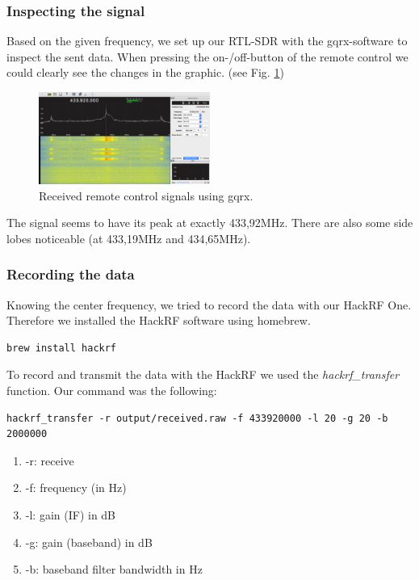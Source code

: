 \documentclass[conference]{IEEEtran}
\begin{document}
\subsubsection{Inspecting the signal}
Based on the given frequency, we set up our RTL-SDR with the gqrx-software to inspect the sent data. When pressing the on-/off-button of the remote control we could clearly see the changes in the graphic. (see Fig. \ref{fig:remote_gqrx})


\begin{figure}[H]
	\centering
	\includegraphics[width=0.5\textwidth]{gqrx_remote_control}
	\caption{Received remote control signals using gqrx.}
	\label{fig:remote_gqrx}
\end{figure}

The signal seems to have its peak at exactly 433,92MHz. There are also some side lobes noticeable (at 433,19MHz and 434,65MHz). 
\subsubsection{Recording the data}
Knowing the center frequency, we tried to record the data with our HackRF One. Therefore we installed the HackRF software \cite{hackrfsoftware} using homebrew.
\begin{lstlisting}
brew install hackrf
\end{lstlisting}

To record and transmit the data with the HackRF we used the \textit{hackrf\_transfer} function. Our command was the following:
\begin{lstlisting}
hackrf_transfer -r output/received.raw -f 433920000 -l 20 -g 20 -b 2000000
\end{lstlisting}
\begin{enumerate}
	\item -r: receive
	\item -f: frequency (in Hz)
	\item -l: gain (IF) in dB
	\item -g: gain (baseband) in dB
	\item -b: baseband filter bandwidth in Hz
\end{enumerate}
\bigbreak
\end{document}
